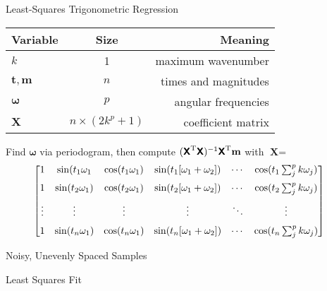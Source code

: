 \documentclass{beamer}
\begin{document}
\begin{frame}{Least-Squares Trigonometric Regression}%
\begin{center}
\begin{tabular}{lcr}
\textbf{Variable} & \textbf{Size} & \textbf{Meaning} \\ \hline\hline
$k$ & 1 & maximum wavenumber \\
$\mathbf{t}, \mathbf{m}$ & $n$ & times and magnitudes \\
$\boldsymbol \omega$ & $p$ & angular frequencies \\
$\mathbf X$ & ${n \times (2k^p+1)}$ & coefficient matrix \\ \hline
\end{tabular}
\end{center}
Find $\boldsymbol \omega$ via periodogram, then compute $(\textsf{\textbf{X}}^\text{T} \textsf{\textbf{X}})^{-1} \textsf{\textbf{X}}^\text{T} \mathbf{m}$ with $\textbf{X} = $ \setlength{\arraycolsep}{4pt} $$ 
\hspace*{-3mm} \begin{bmatrix}
1 & \sin(t_1 \omega_1
  & \cos(t_1 \omega_1)
  & \sin(t_1 [\omega_1 + \omega_2]) & \cdots
  & \cos(t_1 \sum_j^{p} k\omega_j) \\[1.5ex]

1 & \sin(t_2 \omega_1)
  & \cos(t_2 \omega_1) 
  & \sin(t_2 [\omega_1 + \omega_2]) & \cdots
  & \cos(t_2 \sum_j^p k\omega_j) \\[1.5ex]

\vdots & \vdots 
       & \vdots 
       & \vdots & \ddots 
       & \vdots \\[1.5ex]

1 & \sin(t_n \omega_1)
  & \cos(t_n \omega_1) 
  & \sin(t_n [\omega_1 + \omega_2]) & \cdots
  & \cos(t_n \sum_j^p k\omega_j)
\end{bmatrix} $$
\end{frame}

\begin{frame}{Noisy, Unevenly Spaced Samples}
\begin{figure}
\centering

\end{figure} 
\end{frame}

\begin{frame}{Least Squares Fit}
\begin{figure}
\centering

\end{figure} 
\end{frame}
\end{document}
